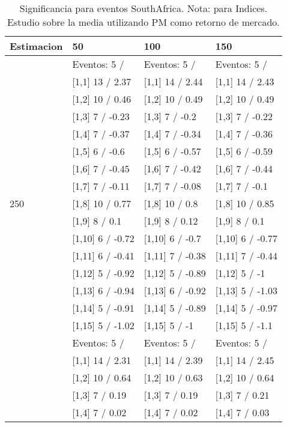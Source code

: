 \begin{table}

\caption{Significancia para eventos SouthAfrica. Nota: para Indices. Estudio sobre la media utilizando PM como retorno de mercado.}
\centering
\begin{tabular}[t]{llll}
\toprule
Estimacion & 50 & 100 & 150\\
\midrule
 & Eventos:  5 / & Eventos:  5 / & Eventos:  5 /\\
 & {}[1,1] 13  / 2.37 & {}[1,1] 14  / 2.44 & {}[1,1] 14  / 2.43\\
 & {}[1,2] 10  / 0.46 & {}[1,2] 10  / 0.49 & {}[1,2] 10  / 0.49\\
 & {}[1,3] 7  / -0.23 & {}[1,3] 7  / -0.2 & {}[1,3] 7  / -0.22\\
 & {}[1,4] 7  / -0.37 & {}[1,4] 7  / -0.34 & {}[1,4] 7  / -0.36\\
\addlinespace
 & {}[1,5] 6  / -0.6 & {}[1,5] 6  / -0.57 & {}[1,5] 6  / -0.59\\
 & {}[1,6] 7  / -0.45 & {}[1,6] 7  / -0.42 & {}[1,6] 7  / -0.44\\
 & {}[1,7] 7  / -0.11 & {}[1,7] 7  / -0.08 & {}[1,7] 7  / -0.1\\
250 & {}[1,8] 10  / 0.77 & {}[1,8] 10  / 0.8 & {}[1,8] 10  / 0.85\\
 & {}[1,9] 8  / 0.1 & {}[1,9] 8  / 0.12 & {}[1,9] 8  / 0.1\\
\addlinespace
 & {}[1,10] 6  / -0.72 & {}[1,10] 6  / -0.7 & {}[1,10] 6  / -0.77\\
 & {}[1,11] 6  / -0.41 & {}[1,11] 7  / -0.38 & {}[1,11] 7  / -0.44\\
 & {}[1,12] 5  / -0.92 & {}[1,12] 5  / -0.89 & {}[1,12] 5  / -1\\
 & {}[1,13] 6  / -0.94 & {}[1,13] 6  / -0.92 & {}[1,13] 5  / -1.03\\
 & {}[1,14] 5  / -0.91 & {}[1,14] 5  / -0.89 & {}[1,14] 5  / -0.97\\
\addlinespace
 & {}[1,15] 5  / -1.02 & {}[1,15] 5  / -1 & {}[1,15] 5  / -1.1\\
 & Eventos:  5 / & Eventos:  5 / & Eventos:  5 /\\
 & {}[1,1] 14  / 2.31 & {}[1,1] 14  / 2.39 & {}[1,1] 14  / 2.45\\
 & {}[1,2] 10  / 0.64 & {}[1,2] 10  / 0.63 & {}[1,2] 10  / 0.64\\
 & {}[1,3] 7  / 0.19 & {}[1,3] 7  / 0.19 & {}[1,3] 7  / 0.21\\
\addlinespace
 & {}[1,4] 7  / 0.02 & {}[1,4] 7  / 0.02 & {}[1,4] 7  / 0.03\\

\end{tabular}
\end{table}

